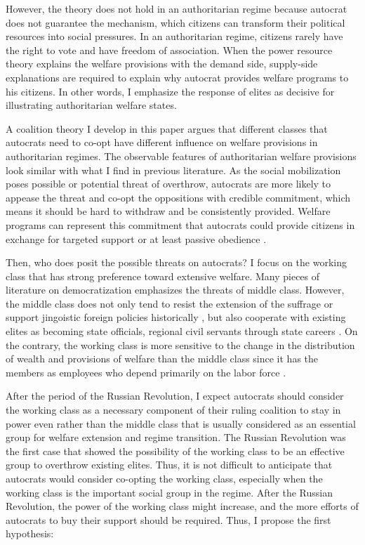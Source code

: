\documentclass[12pt, letterpage, notitlepage]{article}
\begin{document}
However, the theory does not hold in an authoritarian regime because autocrat does not guarantee the mechanism, which citizens can transform their political resources into social pressures. In an authoritarian regime, citizens rarely have the right to vote and have freedom of association. When the power resource theory explains the welfare provisions with the demand side, supply-side explanations are required to explain why autocrat provides welfare programs to his citizens. In other words, I emphasize the response of elites as decisive for illustrating authoritarian welfare states.

A coalition theory I develop in this paper argues that different classes that autocrats need to co-opt have different influence on welfare provisions in authoritarian regimes. The observable features of authoritarian welfare provisions look similar with what I find in previous literature. As the social mobilization poses possible or potential threat of overthrow, autocrats are more likely to appease the threat and co-opt the oppositions with credible commitment, which means it should be hard to withdraw and be consistently provided. Welfare programs can represent this commitment that autocrats could provide citizens in exchange for targeted support or at least passive obedience \citep{Cassani2017a}.

Then, who does posit the possible threats on autocrats? I focus on the working class that has strong preference toward extensive welfare. Many pieces of literature on democratization emphasizes the threats of middle class. However, the middle class does not only tend to resist the extension of the suffrage or support jingoistic foreign policies historically \citep{Lipset1959}, but also cooperate with existing elites as becoming state officials, regional civil servants through state careers \citep{Rosenfeld2017}. On the contrary, the working class is more sensitive to the change in the distribution of wealth and provisions of welfare than the middle class since it has the members as employees who depend primarily on the labor force \citep{Korpi2006}.

After the period of the Russian Revolution, I expect autocrats should consider the working class as a necessary component of their ruling coalition to stay in power even rather than the middle class that is usually considered as an essential group for welfare extension and regime transition. The Russian Revolution was the first case that showed the possibility of the working class to be an effective group to overthrow existing elites. Thus, it is not difficult to anticipate that autocrats would consider co-opting the working class, especially when the working class is the important social group in the regime. After the Russian Revolution, the power of the working class might increase, and the more efforts of autocrats to buy their support should be required. Thus, I propose the first hypothesis:\par
\end{document}
